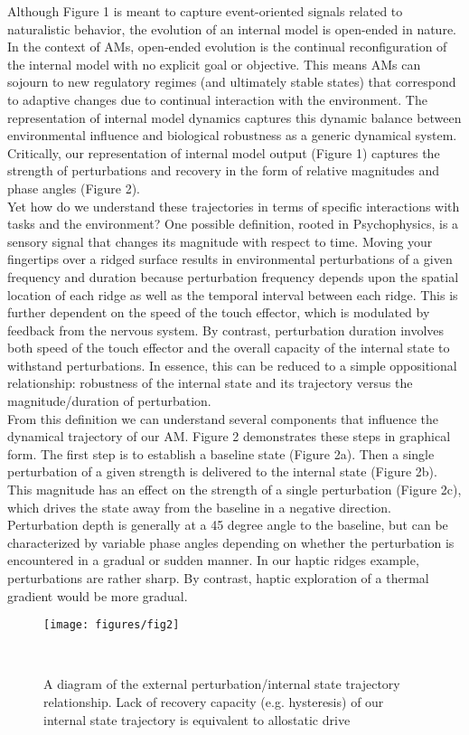 \documentclass{sigchi}
\begin{document}
Although Figure 1 is meant to capture event-oriented signals related to naturalistic behavior, the evolution of an internal model is open-ended \cite{adam} in nature. In the context of AMs, open-ended evolution is the continual reconfiguration of the internal model with no explicit goal or objective. This means AMs can sojourn to new regulatory regimes (and ultimately stable states) that correspond to adaptive changes due to continual interaction with the environment. The representation of internal model dynamics captures this dynamic balance between environmental influence and biological robustness as a generic dynamical system. Critically, our representation of internal model output (Figure 1) captures the strength of perturbations and recovery in the form of relative magnitudes and phase angles (Figure 2). \\
Yet how do we understand these trajectories in terms of specific interactions with tasks and the environment? One possible definition, rooted in Psychophysics, is a sensory signal that changes its magnitude with respect to time. Moving your fingertips over a ridged surface results in environmental perturbations of a given frequency and duration because perturbation frequency depends upon the spatial location of each ridge as well as the temporal interval between each ridge. This is further dependent on the speed of the touch effector, which is modulated by feedback from the nervous system. By contrast, perturbation duration involves both speed of the touch effector and the overall capacity of the internal state to withstand perturbations. In essence, this can be reduced to a simple oppositional relationship: robustness of the internal state and its trajectory versus the magnitude/duration of perturbation. \\
From this definition we can understand several components that influence the dynamical trajectory of our AM. Figure 2 demonstrates these steps in graphical form. The first step is to establish a baseline state (Figure 2a). Then a single perturbation of a given strength is delivered to the internal state (Figure 2b). This magnitude has an effect on the strength of a single perturbation (Figure 2c), which drives the state away from the baseline in a negative direction. Perturbation depth is generally at a 45 degree angle to the baseline, but can be characterized by variable phase angles depending on whether the perturbation is encountered in a gradual or sudden manner. In our haptic ridges example, perturbations are rather sharp. By contrast, haptic exploration of a thermal gradient would be more gradual. \\
\begin{figure}[h]
\centering
  \texttt{[image: figures/fig2]}
  \caption{A diagram of the external perturbation/internal state trajectory relationship. Lack of recovery capacity (e.g. hysteresis) of our internal state trajectory is equivalent to allostatic drive}~\label{fig:figure2}
\end{figure}
\end{document}
